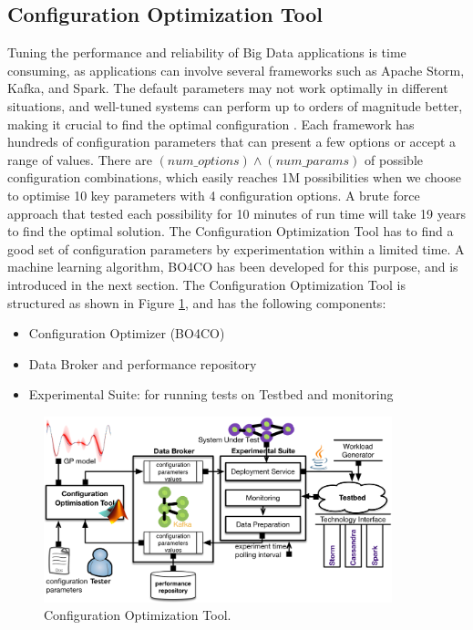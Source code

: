 \subsection{Configuration Optimization Tool}
Tuning the performance and reliability of Big Data applications is time consuming, as applications can involve several frameworks such as Apache Storm, Kafka, and Spark. The default parameters may not work optimally in different situations, and well-tuned systems can perform up to orders of magnitude better, making it crucial to find the optimal configuration \cite{bo4co}. Each framework has hundreds of configuration parameters that can present a few options or accept a range of values. There are $(num\_options)\wedge(num\_params)$ of possible configuration combinations, which easily reaches 1M possibilities when we choose to optimise 10 key parameters with 4 configuration options. A brute force approach that tested each possibility for 10 minutes of run time will take 19 years to find the optimal solution. The Configuration Optimization Tool has to find a good set of configuration parameters by experimentation within a limited time. A machine learning algorithm, BO4CO has been developed for this purpose, and is introduced in the next section. 
The Configuration Optimization Tool is structured as shown in Figure \ref{fig:cotool}, and has the following components:
\begin{itemize}
\item Configuration Optimizer (BO4CO)
\item Data Broker and performance repository
\item Experimental Suite: for running tests on Testbed and monitoring
\end{itemize}
\begin{figure}[h]
\centering
\caption{Configuration Optimization Tool. \cite{bo4cogit}}
\label{fig:cotool}
\includegraphics[width=0.9\textwidth]{images/cotool.png}
\end{figure}
